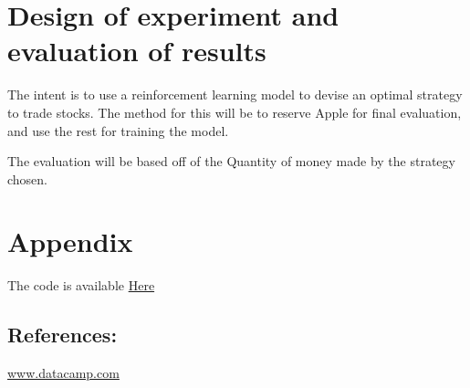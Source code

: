 \documentclass{article}
\begin{document}
\section{Design of experiment and evaluation of results}

    The intent is to use a reinforcement learning model to devise an optimal strategy to trade stocks.
    The method for this will be to reserve Apple for final evaluation, and use the rest for training the model.
    
    The evaluation will be based off of the Quantity of money made by the strategy chosen.


    

    
\section{Appendix}
    The code is available
    \hyperlink{https://github.com/Elijawhan/CPE490PROJECT}{Here}
\subsection*{References: }
    \hyperlink{https://www.datacamp.com/tutorial/lstm-python-stock-market}{www.datacamp.com}
\end{document}
